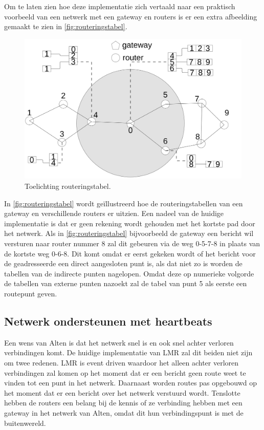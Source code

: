 \documentclass[a4paper, 11pt, oneside]{report}
\begin{document}
Om te laten zien hoe deze implementatie zich vertaald naar een praktisch voorbeeld van een netwerk met een gateway en routers is er een extra afbeelding gemaakt te zien in \autoref{fig:routeringstabel}.

\begin{figure}[H]
	\begin{center}\includegraphics[width=0.6\linewidth]{Afbeeldingen/uitlegtabel.png}\end{center}
	\caption{Toelichting routeringstabel.}
	\label{fig:routeringstabel}
\end{figure}

In \autoref{fig:routeringstabel} wordt geïllustreerd hoe de routeringstabellen van een gateway en verschillende routers er uitzien.
Een nadeel van de huidige implementatie is dat er geen rekening wordt gehouden met het kortste pad door het netwerk.
Als in \autoref{fig:routeringstabel} bijvoorbeeld de gateway een bericht wil versturen naar router nummer 8 zal dit gebeuren via de weg 0-5-7-8 in plaats van de kortste weg 0-6-8. Dit komt omdat er eerst gekeken wordt of het bericht voor de geadresseerde een direct aangesloten punt is, als dat niet zo is worden de tabellen van de indirecte punten nagelopen. Omdat deze op numerieke volgorde de tabellen van externe punten nazoekt zal de tabel van punt 5 als eerste een routepunt geven.

\subsection{Netwerk ondersteunen met heartbeats}

Een wens van Alten is dat het netwerk snel is en ook snel achter verloren verbindingen komt. 
De huidige implementatie van LMR zal dit beiden niet zijn om twee redenen.
LMR is event driven waardoor het alleen achter verloren verbindingen zal komen op het moment dat er een bericht geen route weet te vinden tot een punt in het netwerk.
Daarnaast worden routes pas opgebouwd op het moment dat er een bericht over het netwerk verstuurd wordt.
Tenslotte hebben de routers een belang bij de kennis of ze verbinding hebben met een gateway in het netwerk van Alten, omdat dit hun verbindingspunt is met de buitenwereld.
\end{document}
